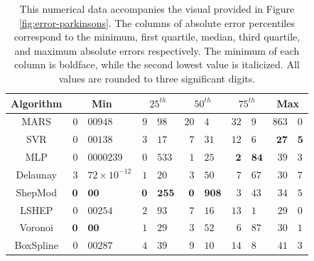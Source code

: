\documentclass[smallextended,final]{svjour3}  %
\begin{document}
\begin{appendix}
\begin{table}
  \centering
  \begin{tabular}{c|r@{.}l|r@{.}l|r@{.}l|r@{.}l|r@{.}l}
    \hline
    Algorithm & \multicolumn{2}{c|}{Min} & \multicolumn{2}{c|}{$25^{th}$} & \multicolumn{2}{c|}{$50^{th}$} & \multicolumn{2}{c|}{$75^{th}$} & \multicolumn{2}{c}{Max}\\
    \hline
    MARS & $0$&$00948$ & $9$&$98$ & $20$&$4$ & $32$&$9$ & $863$&$0$\\
    SVR & $0$&$00138$ & $3$&$17$ & $7$&$31$ & $12$&$6$ & $\mathbf{27}$&$\mathbf{5}$\\
    MLP & $0$&$0000239$ & $\mathit{0}$&$\mathit{533}$ & $\mathit{1}$&$\mathit{25}$ & $\mathbf{2}$&$\mathbf{84}$ & $39$&$3$\\
    Delaunay & $\mathit{3}$&$\mathit{72 \times 10^{-12}}$ & $1$&$20$ & $3$&$50$ & $7$&$67$ & $30$&$7$\\
    ShepMod & $\mathbf{0}$&$\mathbf{00}$ & $\mathbf{0}$&$\mathbf{255}$ & $\mathbf{0}$&$\mathbf{908}$ & $\mathit{3}$&$\mathit{43}$ & $34$&$5$\\
    LSHEP & $0$&$00254$ & $2$&$93$ & $7$&$16$ & $13$&$1$ & $\mathit{29}$&$\mathit{0}$\\
    Voronoi & $\mathbf{0}$&$\mathbf{00}$ & $1$&$29$ & $3$&$52$ & $6$&$87$ & $30$&$1$\\
    BoxSpline & $0$&$00287$ & $4$&$39$ & $9$&$10$ & $14$&$8$ & $41$&$3$\\
    \hline
  \end{tabular}
  \caption{This numerical data accompanies the visual provided in
    Figure \ref{fig:error-parkinsons}. The columns of absolute error
    percentiles correspond to the minimum, first quartile, median,
    third quartile, and maximum absolute errors respectively. The
    minimum of each column is boldface, while the second lowest value
    is italicized. All values are rounded to three significant
    digits.}
  \label{table:error-parkinsons}
\end{table}


\end{appendix}
\end{document}
